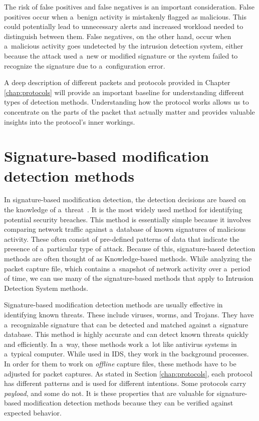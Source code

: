 \documentclass[
  printed,     %
  color,       %
  oneside,     %
  nosansbold,  %
  nocolorbold, %
  nolof,         %
  nolot,         %
]{fithesis4}
\begin{document}
The risk of false positives and false negatives is an important consideration. False positives occur when a~benign activity is mistakenly flagged as malicious. This could potentially lead to unnecessary alerts and increased workload needed to distinguish between them. False negatives, on the other hand, occur when a~malicious activity goes undetected by the intrusion detection system, either because the attack used a~new or modified signature or the system failed to recognize the signature due to a~configuration error. 

A deep description of different packets and protocols provided in Chapter \ref{chap:protocols} will provide an important baseline for understanding different types of detection methods. Understanding how the protocol works allows us to concentrate on the parts of the packet that actually matter and provides valuable insights into the protocol's inner workings.

\section{Signature-based modification detection methods}

In signature-based modification detection, the detection decisions are based on the knowledge of a~threat~\cite{LIAO201316}. It is the most widely used method for identifying potential security breaches. This method is essentially simple because it involves comparing network traffic against a~database of known signatures of malicious activity. These often consist of pre-defined patterns of data that indicate the presence of a~particular type of attack. Because of this, signature-based detection methods are often thought of as Knowledge-based methods. While analyzing the packet capture file, which contains a~snapshot of network activity over a~period of time, we can use many of the signature-based methods that apply to Intrusion Detection System methods.

Signature-based modification detection methods are usually effective in identifying known threats. These include viruses, worms, and Trojans. They have a~recognizable signature that can be detected and matched against a~signature database. This method is highly accurate and can detect known threats quickly and efficiently. In a~way, these methods work a~lot like antivirus systems in a~typical computer. While used in IDS, they work in the background processes. In order for them to work on \textit{offline} capture files, these methods have to be adjusted for packet captures. As stated in Section \ref{chap:protocols}, each protocol has different patterns and is used for different intentions. Some protocols carry \textit{payload}, and some do not. It is these properties that are valuable for signature-based modification detection methods because they can be verified against expected behavior. 
\end{document}
